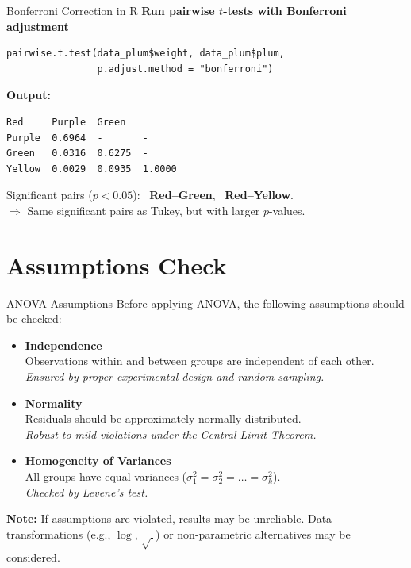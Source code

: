 \documentclass[aspectratio=169]{beamer}
\begin{document}
\begin{frame}[fragile]{Bonferroni Correction in R}
\textbf{Run pairwise $t$-tests with Bonferroni adjustment}
\begin{lstlisting}
pairwise.t.test(data_plum$weight, data_plum$plum,
                p.adjust.method = "bonferroni")
\end{lstlisting}

\vspace{4pt}
\textbf{Output:}
\begin{lstlisting}[numbers=none, backgroundcolor=\color{yellow!8}]
        Red     Purple  Green
Purple  0.6964  -       -
Green   0.0316  0.6275  -
Yellow  0.0029  0.0935  1.0000
\end{lstlisting}

\vspace{4pt}
Significant pairs ($p < 0.05$): \ \textbf{Red--Green}, \ \textbf{Red--Yellow}. \\
$\Rightarrow$ Same significant pairs as Tukey, but with larger $p$-values.
\end{frame}

\section{Assumptions Check}
\begin{frame}{ANOVA Assumptions}
Before applying ANOVA, the following assumptions should be checked:\\
\vspace{8pt}

\begin{itemize}\setlength{\itemsep}{8pt}
  \item \textbf{Independence} \\
        Observations within and between groups are independent of each other.
        \\ \textit{Ensured by proper experimental design and random sampling.}

\item \textbf{Normality} \\
      Residuals should be approximately normally distributed. 
      \\ \textit{Robust to mild violations under the Central Limit Theorem.}

  \item \textbf{Homogeneity of Variances} \\
        All groups have equal variances ($\sigma_1^2 = \sigma_2^2 = \dots = \sigma_k^2$).
        \\ \textit{Checked by Levene's test.}
\end{itemize}
\vspace{8pt}

\textbf{Note:} If assumptions are violated, results may be unreliable. Data transformations (e.g., $\log$, $\sqrt{\ }$) or non-parametric alternatives may be considered.
\end{frame}
\end{document}
